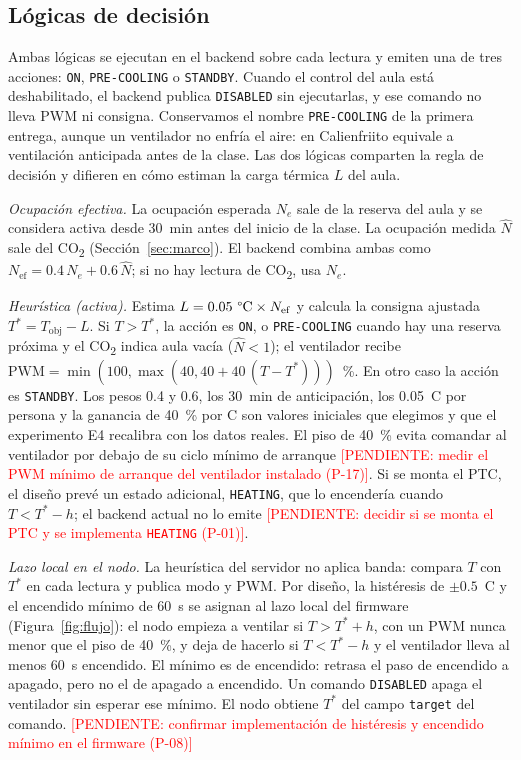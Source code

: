 \documentclass[manuscript,screen,nonacm,natbib=false]{acmart}
\newcommand{\pendiente}[1]{\textcolor{red}{[PENDIENTE: #1]}}
\newcommand{\gradC}{\textdegree{}C}
\newcommand{\COdos}{CO\textsubscript{2}}
\begin{document}
\subsection{Lógicas de decisión}
\label{sec:decision}
Ambas lógicas se ejecutan en el backend sobre cada lectura y emiten una de tres acciones: \texttt{ON}, \texttt{PRE-COOLING} o \texttt{STANDBY}. Cuando el control del aula está deshabilitado, el backend publica \texttt{DISABLED} sin ejecutarlas, y ese comando no lleva PWM ni consigna. Conservamos el nombre \texttt{PRE-COOLING} de la primera entrega, aunque un ventilador no enfría el aire: en Calienfriito equivale a ventilación anticipada antes de la clase. Las dos lógicas comparten la regla de decisión y difieren en cómo estiman la carga térmica $L$ del aula.

\textit{Ocupación efectiva.} La ocupación esperada $N_e$ sale de la reserva del aula y se considera activa desde 30~min antes del inicio de la clase. La ocupación medida $\hat N$ sale del \COdos{} (Sección~\ref{sec:marco}). El backend combina ambas como $N_{\mathrm{ef}} = 0.4\,N_e + 0.6\,\hat N$; si no hay lectura de \COdos{}, usa $N_e$.

\textit{Heurística (activa).} Estima $L = 0.05~\text{\gradC{}} \times N_{\mathrm{ef}}$ y calcula la consigna ajustada $T^{*} = T_{\mathrm{obj}} - L$. Si $T > T^{*}$, la acción es \texttt{ON}, o \texttt{PRE-COOLING} cuando hay una reserva próxima y el \COdos{} indica aula vacía ($\hat N < 1$); el ventilador recibe $\mathrm{PWM} = \min(100, \max(40, 40 + 40\,(T-T^{*})))$~\%. En otro caso la acción es \texttt{STANDBY}. Los pesos 0.4 y 0.6, los 30~min de anticipación, los 0.05~\gradC{} por persona y la ganancia de 40~\% por \gradC{} son valores iniciales que elegimos y que el experimento E4 recalibra con los datos reales. El piso de 40~\% evita comandar al ventilador por debajo de su ciclo mínimo de arranque \pendiente{medir el PWM mínimo de arranque del ventilador instalado (P-17)}. Si se monta el PTC, el diseño prevé un estado adicional, \texttt{HEATING}, que lo encendería cuando $T < T^{*} - h$; el backend actual no lo emite \pendiente{decidir si se monta el PTC y se implementa \texttt{HEATING} (P-01)}.

\textit{Lazo local en el nodo.} La heurística del servidor no aplica banda: compara $T$ con $T^{*}$ en cada lectura y publica modo y PWM. Por diseño, la histéresis de $\pm 0.5$~\gradC{} y el encendido mínimo de 60~s se asignan al lazo local del firmware (Figura~\ref{fig:flujo}): el nodo empieza a ventilar si $T > T^{*} + h$, con un PWM nunca menor que el piso de 40~\%, y deja de hacerlo si $T < T^{*} - h$ y el ventilador lleva al menos 60~s encendido. El mínimo es de encendido: retrasa el paso de encendido a apagado, pero no el de apagado a encendido. Un comando \texttt{DISABLED} apaga el ventilador sin esperar ese mínimo. El nodo obtiene $T^{*}$ del campo \texttt{target} del comando. \pendiente{confirmar implementación de histéresis y encendido mínimo en el firmware (P-08)}
\end{document}
